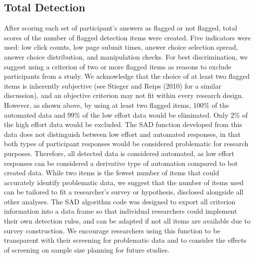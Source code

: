 \documentclass[english,man]{apa6}
\theoremstyle{definition}
\theoremstyle{definition}
\theoremstyle{definition}
\theoremstyle{remark}
\begin{document}
\subsection{Total Detection}\label{total-detection}

After scoring each set of participant's answers as flagged or not
flagged, total scores of the number of flagged detection items were
created. Five indicators were used: low click counts, low page submit
times, answer choice selection spread, answer choice distribution, and
manipulation checks. For best discrimination, we suggest using a
criterion of two or more flagged items as reasons to exclude
participants from a study. We acknowledge that the choice of at least
two flagged items is inherently subjective (see Stieger and Reips (2010)
for a similar discussion), and an objective criterion may not fit within
every research design. However, as shown above, by using at least two
flagged items, 100\% of the automated data and 99\% of the low effort
data would be eliminated. Only 2\% of the high effort data would be
excluded. The SAD function developed from this data does not distinguish
between low effort and automated responses, in that both types of
participant responses would be considered problematic for research
purposes. Therefore, all detected data is considered automated, as low
effort responses can be considered a derivative type of automation
compared to bot created data. While two items is the fewest number of
items that could accurately identify problematic data, we suggest that
the number of items used can be tailored to fit a researcher's survey or
hypothesis, disclosed alongside all other analyses. The SAD algorithm
code was designed to export all criterion information into a data frame
so that individual researchers could implement their own detection
rules, and can be adapted if not all items are available due to survey
construction. We encourage researchers using this function to be
transparent with their screening for problematic data and to consider
the effects of screening on sample size planning for future studies.
\end{document}
